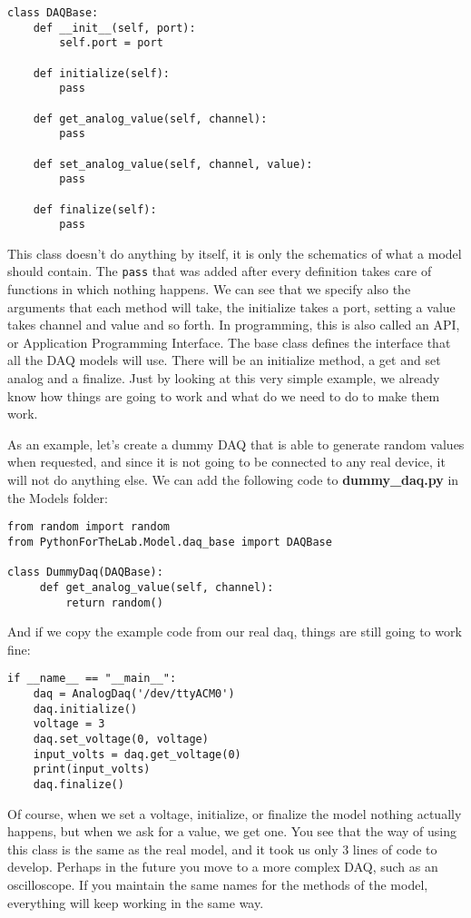 \begin{verbatim}
class DAQBase:
    def __init__(self, port):
        self.port = port
    
    def initialize(self):
        pass 
            
    def get_analog_value(self, channel):
        pass
    
    def set_analog_value(self, channel, value):
        pass
    
    def finalize(self):
        pass
\end{verbatim}

This class doesn't do anything by itself, it is only the schematics of what a model should contain. The \texttt{pass} that was added after every definition takes care of functions in which nothing happens. We can see that we specify also the arguments that each method will take, the initialize takes a port, setting a value takes channel and value and so forth. In programming, this is also called an API, or Application Programming Interface. The base class defines the interface that all the DAQ models will use. There will be an initialize method, a get and set analog and a finalize. Just by looking at this very simple example, we already know how things are going to work and what do we need to do to make them work. 

As an example, let's create a dummy DAQ that is able to generate random values when requested, and since it is not going to be connected to any real device, it will not do anything else. We can add the following code to \textbf{dummy\_daq.py} in the Models folder:

\begin{verbatim}
from random import random
from PythonForTheLab.Model.daq_base import DAQBase

class DummyDaq(DAQBase):
     def get_analog_value(self, channel):
         return random()
\end{verbatim}

And if we copy the example code from our real daq, things are still going to work fine:

\begin{verbatim}
if __name__ == "__main__":
    daq = AnalogDaq('/dev/ttyACM0')
    daq.initialize()
    voltage = 3
    daq.set_voltage(0, voltage)
    input_volts = daq.get_voltage(0)
    print(input_volts)
    daq.finalize()
\end{verbatim}

Of course, when we set a voltage, initialize, or finalize the model nothing actually happens, but when we ask for a value, we get one. You see that the way of using this class is the same as the real model, and it took us only 3 lines of code to develop. Perhaps in the future you move to a more complex DAQ, such as an oscilloscope. If you maintain the same names for the methods of the model, everything will keep working in the same way. 

